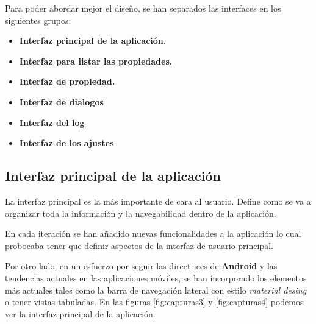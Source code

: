 \bigskip
Para poder abordar mejor el diseño, se han separados las interfaces en los siguientes grupos:

\begin{itemize}
  \item \textbf{Interfaz principal de la aplicación.}
  \item \textbf{Interfaz para listar las propiedades.}
  \item \textbf{Interfaz de propiedad.}
  \item \textbf{Interfaz de dialogos}
  \item \textbf{Interfaz del log}
  \item \textbf{Interfaz de los ajustes}
\end{itemize}

\bigskip
\subsection{Interfaz principal de la aplicación}

La interfaz principal es la más importante de cara al usuario. Define como se va a organizar toda la información y la navegabilidad dentro de la aplicación. 

\bigskip
En cada iteración se han añadido nuevas funcionalidades a la aplicación lo cual probocaba tener que definir aspectos de la interfaz de usuario principal. 

\bigskip
Por otro lado, en un esfuerzo por seguir las directrices de \textbf{Android} y las tendencias actuales en las aplicaciones móviles, se han incorporado los elementos más actuales tales como la barra de navegación lateral con estilo \textit{material desing} o tener vistas tabuladas. En las figuras \ref{fig:capturas3} y \ref{fig:capturas4} podemos ver la interfaz principal de la aplicación.

